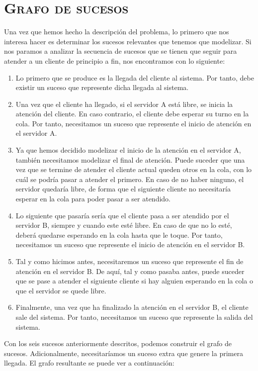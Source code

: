\documentclass[11pt,a4paper]{article}
\begin{document}
\section{\textsc{Grafo de sucesos}}

Una vez que hemos hecho la descripción del problema, lo primero que nos interesa hacer es determinar
los sucesos relevantes que tenemos que modelizar. Si nos paramos a analizar la secuencia de sucesos
que se tienen que seguir para atender a un cliente de principio a fin, nos encontramos con lo siguiente:

\begin{enumerate}
	\item Lo primero que se produce es la llegada del cliente al sistema. Por tanto, debe existir
	un suceso que represente dicha llegada al sistema.
	\item Una vez que el cliente ha llegado, si el servidor A está libre, se inicia la atención
	del cliente. En caso contrario, el cliente debe esperar su turno en la cola. Por tanto, necesitamos
	un suceso que represente el inicio de atención en el servidor A.
	\item Ya que hemos decidido modelizar el inicio de la atención en el servidor A, también necesitamos
	modelizar el final de atención. Puede suceder que una vez que se termine de atender el cliente actual
	queden otros en la cola, con lo cuál se podría pasar a atender el primero. En caso de no haber ninguno,
	el servidor quedaría libre, de forma que el siguiente cliente no necesitaría esperar en la cola para poder
	pasar a ser atendido.
	\item Lo siguiente que pasaría sería que el cliente pasa a ser atendido por el servidor B, siempre
	y cuando este esté libre. En caso de que no lo esté, deberá quedarse esperando en la cola hasta
	que le toque. Por tanto, necesitamos un suceso que represente el inicio de atención en el servidor B.
	\item Tal y como hicimos antes, necesitaremos un suceso que represente el fin de atención en el
	servidor B. De aquí, tal y como pasaba antes, puede suceder que se pase a atender el siguiente cliente
	si hay alguien esperando en la cola o que el servidor se quede libre.
	\item Finalmente, una vez que ha finalizado la atención en el servidor B, el cliente sale del sistema.
	Por tanto, necesitamos un suceso que represente la salida del sistema.
\end{enumerate}

Con los seis sucesos anteriormente descritos, podemos construir el grafo de sucesos. Adicionalmente,
necesitaríamos un suceso extra que genere la primera llegada. El grafo resultante se puede ver a continuación:
\end{document}
